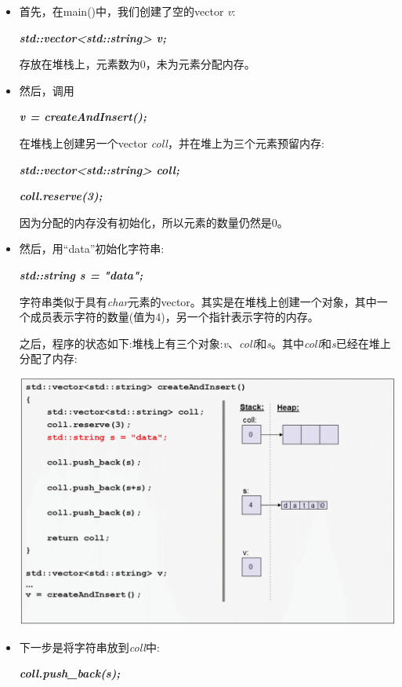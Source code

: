 \begin{itemize}
	\item 首先，在main()中，我们创建了空的vector \textit{v}:\par
	\textit{\textbf{std::vector<std::string> v;}} \par
	存放在堆栈上，元素数为0，未为元素分配内存。
	\item 然后，调用\par
	\textit{\textbf{v = createAndInsert();}}\par
	在堆栈上创建另一个vector \textit{coll}，并在堆上为三个元素预留内存:\par
	\textit{\textbf{std::vector<std::string> coll;}}\par
	\textit{\textbf{coll.reserve(3);}}\par
	因为分配的内存没有初始化，所以元素的数量仍然是0。
	\item 然后，用“data”初始化字符串:\par
	\textit{\textbf{std::string s = "data";}}\par
	字符串类似于具有\textit{char}元素的vector。其实是在堆栈上创建一个对象，其中一个成员表示字符的数量(值为4)，另一个指针表示字符的内存。\par
	之后，程序的状态如下:堆栈上有三个对象:\textit{v}、\textit{coll}和\textit{s}。其中\textit{coll}和\textit{s}已经在堆上分配了内存:\par
	\begin{center}
		\includegraphics[width=1.0\textwidth]{content/1/chapter1/images/1}
	\end{center}
	\item 下一步是将字符串放到\textit{coll}中:\par
	\textbf{\textit{coll.push\_back(s);}}\par

\end{itemize}
